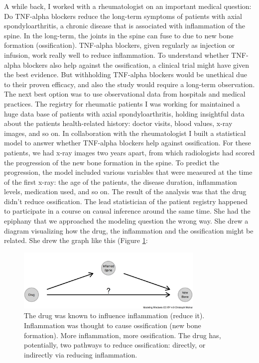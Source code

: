 \documentclass[
  10pt,
]{scrbook}
\begin{document}
A while back, I worked with a rheumatologist on an important medical question:
Do TNF-alpha blockers reduce the long-term symptoms of patients with axial spondyloarthritis, a chronic disease that is associated with inflammation of the spine.
In the long-term, the joints in the spine can fuse to due to new bone formation (ossification).
TNF-alpha blockers, given regularly as injection or infusion, work really well to reduce inflammation.
To understand whether TNF-alpha blockers also help against the ossification, a clinical trial might have given the best evidence.
But withholding TNF-alpha blockers would be unethical due to their proven efficacy, and also the study would require a long-term observation.
The next best option was to use observational data from hospitals and medical practices.
The registry for rheumatic patients I was working for maintained a huge data base of patients with axial spondyloarthritis, holding insightful data about the patients health-related history: doctor visits, blood values, x-ray images, and so on.
In collaboration with the rheumatologist I built a statistical model to answer whether TNF-alpha blockers help against ossification.
For these patients, we had x-ray images two years apart, from which radiologists had scored the progression of the new bone formation in the spine.
To predict the progression, the model included various variables that were measured at the time of the first x-ray: the age of the patients, the disease duration, inflammation levels, medication used, and so on.
The result of the analysis was that the drug didn't reduce ossification.
The lead statistician of the patient registry happened to participate in a course on causal inference around the same time.
She had the epiphany that we approached the modeling question the wrong way.
She drew a diagram visualizing how the drug, the inflammation and the ossification might be related.
She drew the graph like this (Figure \ref{fig:tnfdag}:

\begin{figure}

{\centering \includegraphics[width=0.8\textwidth]{figures/tnfdag-1} 

}

\caption{The drug was known to influence inflammation (reduce it). Inflammation was thought to cause ossification (new bone formation). More inflammation, more ossification. The drug has, potentially, two pathways to reduce ossification: directly, or indirectly via reducing inflammation.}\label{fig:tnfdag}
\end{figure}
\end{document}
